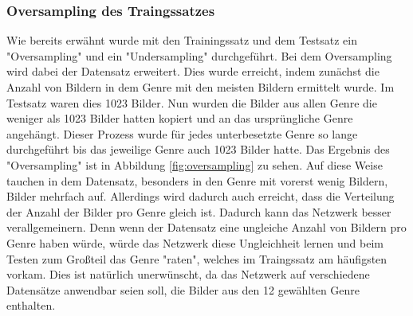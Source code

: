 \subsubsection{Oversampling des Traingssatzes}
Wie bereits erwähnt wurde mit den Trainingssatz und dem Testsatz ein "Oversampling" und ein "Undersampling" durchgeführt.
Bei dem Oversampling wird dabei der Datensatz erweitert.
Dies wurde erreicht, indem zunächst die Anzahl von Bildern in dem Genre mit den meisten Bildern ermittelt wurde.
Im Testsatz waren dies 1023 Bilder.
Nun wurden die Bilder aus allen Genre die weniger als 1023 Bilder hatten kopiert und an das ursprüngliche Genre angehängt.
Dieser Prozess wurde für jedes unterbesetzte Genre so lange durchgeführt bis das jeweilige Genre auch 1023 Bilder hatte.
Das Ergebnis des "Oversampling" ist in Abbildung \ref{fig:oversampling} zu sehen.
Auf diese Weise tauchen in dem Datensatz, besonders in den Genre mit vorerst wenig Bildern, Bilder mehrfach auf.
Allerdings wird dadurch auch erreicht, dass die Verteilung der Anzahl der Bilder pro Genre gleich ist.
Dadurch kann das Netzwerk besser verallgemeinern.
Denn wenn der Datensatz eine ungleiche Anzahl von Bildern pro Genre haben würde, würde das Netzwerk diese Ungleichheit lernen und beim Testen zum Großteil das Genre "raten", welches im Traingssatz am häufigsten vorkam.
Dies ist natürlich unerwünscht, da das Netzwerk auf verschiedene Datensätze anwendbar seien soll, die Bilder aus den 12 gewählten Genre enthalten.
